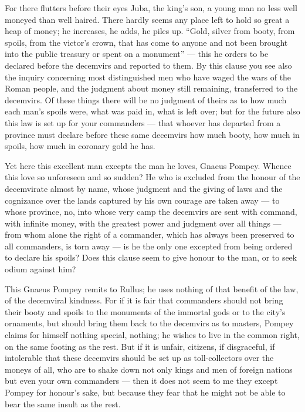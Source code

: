  For there flutters before their eyes Juba, the king's son, a young man no less well moneyed than well haired. There hardly seems any place left to hold so great a heap of money; he increases, he adds, he piles up. ``Gold, silver from booty, from spoils, from the victor's crown, that has come to anyone and not been brought into the public treasury or spent on a monument'' --- this he orders to be declared before the decemvirs and reported to them. By this clause you see also the inquiry concerning most distinguished men who have waged the wars of the Roman people, and the judgment about money still remaining, transferred to the decemvirs. Of these things there will be no judgment of theirs as to how much each man's spoils were, what was paid in, what is left over; but for the future also this law is set up for your commanders --- that whoever has departed from a province must declare before these same decemvirs how much booty, how much in spoils, how much in coronary gold he has.

 Yet here this excellent man excepts the man he loves, Gnaeus Pompey. Whence this love so unforeseen and so sudden? He who is excluded from the honour of the decemvirate almost by name, whose judgment and the giving of laws and the cognizance over the lands captured by his own courage are taken away --- to whose province, no, into whose very camp the decemvirs are sent with command, with infinite money, with the greatest power and judgment over all things --- from whom alone the right of a commander, which has always been preserved to all commanders, is torn away --- is he the only one excepted from being ordered to declare his spoils? Does this clause seem to give honour to the man, or to seek odium against him?

 This Gnaeus Pompey remits to Rullus; he uses nothing of that benefit of the law, of the decemviral kindness. For if it is fair that commanders should not bring their booty and spoils to the monuments of the immortal gods or to the city's ornaments, but should bring them back to the decemvirs as to masters, Pompey claims for himself nothing special, nothing; he wishes to live in the common right, on the same footing as the rest. But if it is unfair, citizens, if disgraceful, if intolerable that these decemvirs should be set up as toll-collectors over the moneys of all, who are to shake down not only kings and men of foreign nations but even your own commanders --- then it does not seem to me they except Pompey for honour's sake, but because they fear that he might not be able to bear the same insult as the rest.

